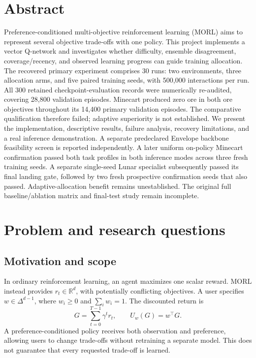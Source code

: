 \section{Abstract}
Preference-conditioned multi-objective reinforcement learning (MORL) aims to
represent several objective trade-offs with one policy. This project implements
a vector Q-network and investigates whether difficulty, ensemble disagreement,
coverage/recency, and observed learning progress can guide training allocation.
The recovered primary experiment comprises 30 runs: two environments, three
allocation arms, and five paired training seeds, with 500,000 interactions per
run. All 300 retained checkpoint-evaluation records were numerically re-audited,
covering 28,800 validation episodes. Minecart produced zero ore in both ore
objectives throughout its 14,400 primary validation episodes. The comparative
qualification therefore failed; adaptive superiority is not established.
We present the implementation, descriptive results, failure analysis, recovery
limitations, and a real inference demonstration. A separate predeclared Envelope
backbone feasibility screen is reported independently. A later uniform on-policy
Minecart confirmation passed both task profiles in both inference modes across
three fresh training seeds. A separate single-seed Lunar specialist subsequently
passed its final landing gate, followed by two fresh prospective confirmation
seeds that also passed. Adaptive-allocation
benefit remains unestablished. The original full baseline/ablation matrix and final-test
study remain incomplete.

\section{Problem and research questions}
\subsection{Motivation and scope}
In ordinary reinforcement learning, an agent maximizes one scalar reward.
MORL instead provides $r_t\in\mathbb{R}^d$, with potentially conflicting
objectives. A user specifies $w\in\Delta^{d-1}$, where $w_i\geq0$ and
$\sum_iw_i=1$. The discounted return is
\[
 G=\sum_{t=0}^{T-1}\gamma^t r_t,\qquad U_w(G)=w^\top G.
\]
A preference-conditioned policy receives both observation and preference,
allowing users to change trade-offs without retraining a separate model.
This does not guarantee that every requested trade-off is learned.

